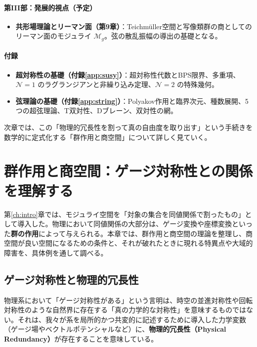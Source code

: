 \documentclass[uplatex, dvipdfmx, book]{jsbook}
\let\origsection\section
\let\origsubsection\subsection
\let\origsubsubsection\subsubsection
\newcommand{\chapter}{\origsection}
\renewcommand{\section}{\origsubsection}
\renewcommand{\subsection}{\origsubsubsection}
\renewcommand{\subsubsection}{\paragraph}
\begin{document}
\paragraph{第III部：発展的視点（予定）}
\begin{itemize}
    \item \textbf{共形場理論とリーマン面（第9章）}：Teichm\"uller空間と写像類群の商としてのリーマン面のモジュライ $\mathcal{M}_g$。弦の散乱振幅の導出の基礎となる。
\end{itemize}

\paragraph{付録}
\begin{itemize}
    \item \textbf{超対称性の基礎（付録\ref{app:susy}）}：超対称性代数とBPS限界、多重項、$\mathcal{N}=1$ のラグランジアンと非繰り込み定理、$\mathcal{N}=2$ の特殊幾何。
    \item \textbf{弦理論の基礎（付録\ref{app:string}）}：Polyakov作用と臨界次元、種数展開、5つの超弦理論、T双対性、Dブレーン、双対性の網。
\end{itemize}

次章では、この「物理的冗長性を割って真の自由度を取り出す」という手続きを数学的に定式化する「群作用と商空間」について詳しく見ていく。

\chapter{群作用と商空間：ゲージ対称性との関係を理解する}
\label{ch:group-action}

第\ref{ch:intro}章では、モジュライ空間を「対象の集合を同値関係で割ったもの」として導入した。物理において同値関係の大部分は、ゲージ変換や座標変換といった\textbf{群の作用}によって与えられる。本章では、群作用と商空間の理論を整理し、商空間が良い空間になるための条件と、それが破れたときに現れる特異点や大域的障害を、具体例を通して調べる。

\section{ゲージ対称性と物理的冗長性}

物理系において「ゲージ対称性がある」という言明は、時空の並進対称性や回転対称性のような自然界に存在する「真の力学的な対称性」を意味するものではない。それは、我々が系を局所的かつ共変的に記述するために導入した力学変数（ゲージ場やベクトルポテンシャルなど）に、\textbf{物理的冗長性（Physical Redundancy）}が存在することを意味している。
\end{document}

